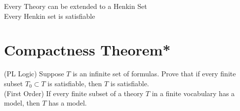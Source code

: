 \documentclass[10pt]{article}
\begin{document}
Every Theory can be extended to a Henkin Set\\
Every Henkin set is satisfiable\\
\section*{Compactness Theorem*}
(PL Logic) Suppose $T$ is an infinite set of formulas. Prove that if every finite subset $T_0\subset T$ is satisfiable, then $T$ is satisfiable.\\
(First Order) If every finite subset of a theory $T$ in a finite vocabulary has a model, then $T$ has a model.
\end{document}
